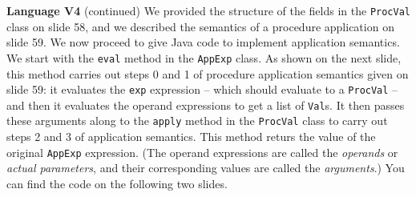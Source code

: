 \begin{minipage}[t]{\sw}
\slidenumber
\LARGE
{\bf Language V4} (continued)\exx
\Large
\emm{}\exx
\LARGE
We provided the structure of the fields
in the \verb'ProcVal' class on slide 58,
and we described the semantics of a procedure application on slide 59.
We now proceed to give Java code to implement application semantics.\exx
We start with the \verb'eval' method in the \verb'AppExp' class.
As shown on the next slide, 
this method carries out steps 0 and 1
of procedure application semantics given on slide 59:
it evaluates the \verb'exp' expression --
which should evaluate to a \verb'ProcVal' --
and then it evaluates the operand expressions
to get a list of \verb'Val's.\exx
It then passes these arguments along
to the \verb'apply' method in the \verb'ProcVal' class
to carry out steps 2 and 3 of application semantics.
This method returs the value of the original \verb'AppExp' expression.
(The operand expressions are called
the {\em operands} or {\em actual parameters},
and their corresponding values are called the {\em arguments}.)\exx
You can find the code on the following two slides.
\end{minipage}

